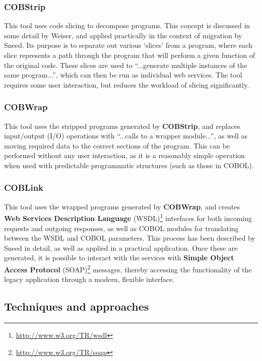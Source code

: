\documentclass[12pt,journal,compsoc]{IEEEtran}
\begin{document}
\subsubsection{COBStrip}
\label{subsubsec:cobstrip}
This tool uses code slicing to decompose programs. This concept is discussed in some detail by Weiser\cite{Weiser1984}, and applied practically in the context of migration by Sneed\cite{Sneed2009,Sneed2008}. Its purpose is to separate out various `slices' from a program, where each slice represents a path through the program that will perform a given function of the original code. These slices are used to ``...generate multiple instances of the same program...''\cite{Sneed2009,Sneed2008}, which can then be run as individual web services. The tool requires some user interaction, but reduces the workload of slicing significantly.

\subsubsection{COBWrap}
\label{subsubsec:cobwrap}
This tool uses the stripped programs generated by \textbf{COBStrip}, and replaces input/output (I/O) operations with ``...calls to a wrapper module...''\cite{Sneed2009,Sneed2008}, as well as moving required data to the correct sections of the program. This can be performed without any user interaction, as it is a reasonably simple operation when used with predictable programmatic structures (such as those in COBOL).

\subsubsection{COBLink}
\label{subsubsec:coblink}
This tool uses the wrapped programs generated by \textbf{COBWrap}, and creates \textbf{Web Services Description Language} (WSDL)\footnote{\url{http://www.w3.org/TR/wsdl}} interfaces for both incoming requests and outgoing responses, as well as COBOL modules for translating between the WSDL and COBOL parameters. This process has been described by Sneed in detail\cite{Sneed2001}, as well as applied in a practical application\cite{Sneed2009,Sneed2008}. Once these are generated, it is possible to interact with the services with \textbf{Simple Object Access Protocol} (SOAP)\footnote{\url{http://www.w3.org/TR/soap}} messages, thereby accessing the functionality of the legacy application through a modern, flexible interface.

\subsection{Techniques and approaches}
\label{subsec:techniques}
\end{document}
